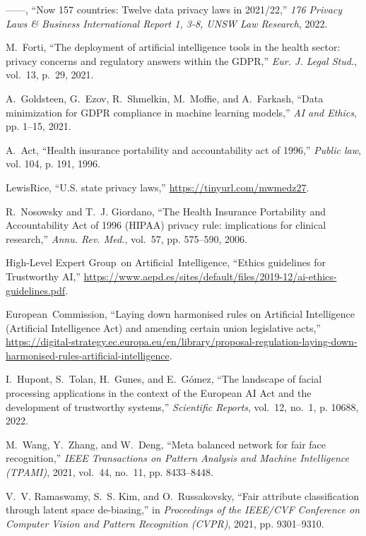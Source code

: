 \documentclass[journal]{IEEEtran}
\begin{document}
\begin{thebibliography}{100}
------, ``Now 157 countries: Twelve data privacy laws in 2021/22,'' \emph{176
  Privacy Laws \& Business International Report 1, 3-8, UNSW Law Research},
  2022.

M.~Forti, ``The deployment of artificial intelligence tools in the health
  sector: privacy concerns and regulatory answers within the GDPR,'' \emph{Eur.
  J. Legal Stud.}, vol.~13, p.~29, 2021.

A.~Goldsteen, G.~Ezov, R.~Shmelkin, M.~Moffie, and A.~Farkash, ``Data
  minimization for GDPR compliance in machine learning models,'' \emph{AI and
  Ethics}, pp. 1--15, 2021.

A.~Act, ``Health insurance portability and accountability act of 1996,''
  \emph{Public law}, vol. 104, p. 191, 1996.

\relax LewisRice, ``U.S. state privacy laws,''
  \url{https://tinyurl.com/mwmedz27}.

R.~Nosowsky and T.~J. Giordano, ``The Health Insurance Portability and
  Accountability Act of 1996 (HIPAA) privacy rule: implications for clinical
  research,'' \emph{Annu. Rev. Med.}, vol.~57, pp. 575--590, 2006.

\relax High-Level Expert Group~on Artificial~Intelligence, ``Ethics guidelines
  for Trustworthy AI,''
  \url{https://www.aepd.es/sites/default/files/2019-12/ai-ethics-guidelines.pdf}.

\relax European~Commission, ``Laying down harmonised rules on Artificial Intelligence (Artificial Intelligence Act) and amending certain union legislative acts,''
  \url{https://digital-strategy.ec.europa.eu/en/library/proposal-regulation-laying-down-harmonised-rules-artificial-intelligence}.

I.~Hupont, S.~Tolan, H.~Gunes, and E.~G{\'o}mez, ``The landscape of facial
  processing applications in the context of the European AI Act and the development of trustworthy systems,'' \emph{Scientific Reports}, vol.~12,
  no.~1, p. 10688, 2022.

M.~Wang, Y.~Zhang, and W.~Deng, ``Meta balanced network for fair face recognition,'' \emph{IEEE Transactions on Pattern Analysis and Machine Intelligence (TPAMI)}, 2021, vol.~44, no.~11, pp. 8433--8448.

V.~V. Ramaswamy, S.~S. Kim, and O.~Russakovsky, ``Fair attribute classification through latent space de-biasing,'' in \emph{Proceedings of the IEEE/CVF Conference on Computer Vision and Pattern   Recognition (CVPR)}, 2021, pp. 9301--9310.


\end{thebibliography}
\end{document}
